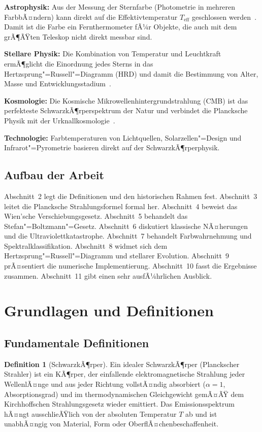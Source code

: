 ﻿\documentclass[a4paper,12pt]{article}
\theoremstyle{definition}
\newtheorem{definition}{Definition}
\begin{document}
\textbf{Astrophysik:} Aus der Messung der Sternfarbe (Photometrie in mehreren
FarbbÃ¤ndern) kann direkt auf die Effektivtemperatur $T_{\text{eff}}$ geschlossen
werden~\cite{allen2000}. Damit ist die Farbe ein Fernthermometer fÃ¼r Objekte,
die auch mit dem grÃ¶ÃŸten Teleskop nicht direkt messbar sind.

\textbf{Stellare Physik:} Die Kombination von Temperatur und Leuchtkraft ermÃ¶glicht
die Einordnung jedes Sterns in das Hertzsprung"=Russell"=Diagramm (HRD) und damit
die Bestimmung von Alter, Masse und Entwicklungsstadium~\cite{salaris2005}.

\textbf{Kosmologie:} Die Kosmische Mikrowellenhintergrundstrahlung (CMB) ist das
perfekteste SchwarzkÃ¶rperspektrum der Natur und verbindet die Plancksche Physik
mit der Urknallkosmologie~\cite{fixsen2009}.

\textbf{Technologie:} Farbtemperaturen von Lichtquellen, Solarzellen"=Design und
Infrarot"=Pyrometrie basieren direkt auf der SchwarzkÃ¶rperphysik.

\subsection{Aufbau der Arbeit}

Abschnitt~2 legt die Definitionen und den historischen Rahmen fest. Abschnitt~3
leitet die Plancksche Strahlungsformel formal her. Abschnitt~4 beweist das
Wien'sche Verschiebungsgesetz. Abschnitt~5 behandelt das Stefan"=Boltzmann"=Gesetz.
Abschnitt~6 diskutiert klassische NÃ¤herungen und die Ultraviolettkatastrophe.
Abschnitt~7 behandelt Farbwahrnehmung und Spektralklassifikation. Abschnitt~8
widmet sich dem Hertzsprung"=Russell"=Diagramm und stellarer Evolution.
Abschnitt~9 prÃ¤sentiert die numerische Implementierung. Abschnitt~10 fasst
die Ergebnisse zusammen. Abschnitt~11 gibt einen sehr ausfÃ¼hrlichen Ausblick.

\section{Grundlagen und Definitionen}

\subsection{Fundamentale Definitionen}

\begin{definition}[SchwarzkÃ¶rper]
    Ein idealer SchwarzkÃ¶rper (Planckscher Strahler) ist ein KÃ¶rper, der einfallende
    elektromagnetische Strahlung jeder WellenlÃ¤nge und aus jeder Richtung vollstÃ¤ndig
    absorbiert ($\alpha = 1$, Absorptionsgrad) und im thermodynamischen Gleichgewicht
    gemÃ¤ÃŸ dem Kirchhoffschen Strahlungsgesetz wieder emittiert. Das Emissionsspektrum
    hÃ¤ngt ausschlieÃŸlich von der absoluten Temperatur $T$ ab und ist unabhÃ¤ngig von
    Material, Form oder OberflÃ¤chenbeschaffenheit.
\end{definition}
\end{document}
